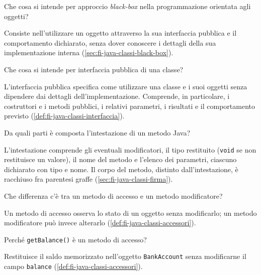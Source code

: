 \begin{exercise}
\label{ex:fi-esercizi-java-classi-black-box}
Che cosa si intende per approccio \emph{black-box} nella programmazione
orientata agli oggetti?
\end{exercise}

Consiste nell'utilizzare un oggetto attraverso la sua interfaccia
pubblica e il comportamento dichiarato, senza dover conoscere i
dettagli della sua implementazione interna
(\cref{sec:fi-java-classi-black-box}).

\begin{exercise}
\label{ex:fi-esercizi-java-classi-interfaccia}
Che cosa si intende per interfaccia pubblica di una classe?
\end{exercise}

L'interfaccia pubblica specifica come utilizzare una classe e i
suoi oggetti senza dipendere dai dettagli dell'implementazione.
Comprende, in particolare, i costruttori e i metodi pubblici,
i relativi parametri, i risultati e il comportamento previsto
(\cref{def:fi-java-classi-interfaccia}).

\begin{exercise}
\label{ex:fi-esercizi-java-classi-intestazione-metodo}
Da quali parti è composta l'intestazione di un metodo Java?
\end{exercise}

L'intestazione comprende gli eventuali modificatori, il tipo
restituito (\texttt{void} se non restituisce un valore), il nome
del metodo e l'elenco dei parametri, ciascuno dichiarato con tipo
e nome. Il corpo del metodo, distinto dall'intestazione, è racchiuso
fra parentesi graffe (\cref{sec:fi-java-classi-firma}).

\begin{exercise}
\label{ex:fi-esercizi-java-classi-accesso-modifica}
Che differenza c'è tra un metodo di accesso e un metodo modificatore?
\end{exercise}

Un metodo di accesso osserva lo stato di un oggetto senza modificarlo;
un metodo modificatore può invece alterarlo
(\cref{def:fi-java-classi-accessori}).

\begin{exercise}
\label{ex:fi-esercizi-java-classi-get-balance}
Perché \texttt{getBalance()} è un metodo di accesso?
\end{exercise}

Restituisce il saldo memorizzato nell'oggetto
\texttt{BankAccount} senza modificarne il campo
\texttt{balance} (\cref{def:fi-java-classi-accessori}).

